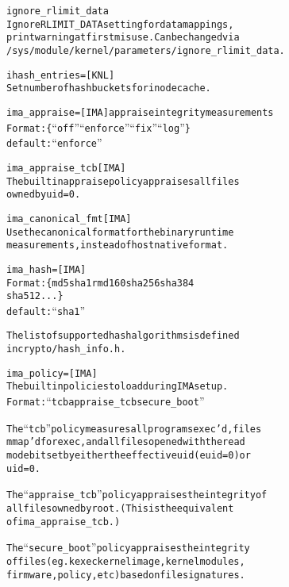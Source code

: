 \documentclass[a4paper,8pt,english]{sphinxmanual}
\begin{document}
\begin{alltt}
        ignore\_rlimit\_data
                        Ignore RLIMIT\_DATA setting for data mappings,
                        print warning at first misuse.  Can be changed via
                        /sys/module/kernel/parameters/ignore\_rlimit\_data.

        ihash\_entries=  {[}KNL{]}
                        Set number of hash buckets for inode cache.

        ima\_appraise=   {[}IMA{]} appraise integrity measurements
                        Format: \{ ``off'' \textbar{} ``enforce'' \textbar{} ``fix'' \textbar{} ``log'' \}
                        default: ``enforce''

        ima\_appraise\_tcb {[}IMA{]}
                        The builtin appraise policy appraises all files
                        owned by uid=0.

        ima\_canonical\_fmt {[}IMA{]}
                        Use the canonical format for the binary runtime
                        measurements, instead of host native format.

        ima\_hash=       {[}IMA{]}
                        Format: \{ md5 \textbar{} sha1 \textbar{} rmd160 \textbar{} sha256 \textbar{} sha384
                                   \textbar{} sha512 \textbar{} ... \}
                        default: ``sha1''

                        The list of supported hash algorithms is defined
                        in crypto/hash\_info.h.

        ima\_policy=     {[}IMA{]}
                        The builtin policies to load during IMA setup.
                        Format: ``tcb \textbar{} appraise\_tcb \textbar{} secure\_boot''

                        The ``tcb'' policy measures all programs exec'd, files
                        mmap'd for exec, and all files opened with the read
                        mode bit set by either the effective uid (euid=0) or
                        uid=0.

                        The ``appraise\_tcb'' policy appraises the integrity of
                        all files owned by root. (This is the equivalent
                        of ima\_appraise\_tcb.)

                        The ``secure\_boot'' policy appraises the integrity
                        of files (eg. kexec kernel image, kernel modules,
                        firmware, policy, etc) based on file signatures.


\end{alltt}
\end{document}
